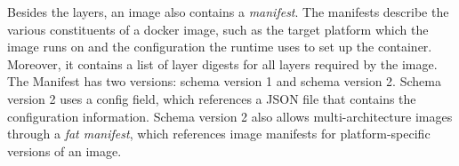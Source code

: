 %
%
%





%
%
%
%
%
%
%
%

%
Besides the layers, an image also contains a \emph{manifest}.
The manifests describe the various constituents of a docker image, such as the
target platform which the image runs on and the 
configuration the runtime uses to set up the container.
%
Moreover, it contains a list of layer digests for all layers required by the image.
%
The Manifest has two versions: schema version 1 and schema version 2.
%
Schema version 2 uses a config field, which references a JSON file that contains the
configuration information.
%
Schema version 2 also allows multi-architecture images through a \emph{fat manifest},
which references image manifests for platform-specific versions of an image.

